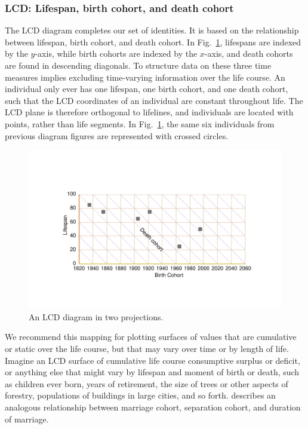 \documentclass[12pt,oneside,a4paper]{article} %
\theoremstyle{definition}
\begin{document}
\FloatBarrier
\subsubsection{LCD: Lifespan, birth cohort, and death cohort}
\label{sec:lcd}
\FloatBarrier

The LCD diagram completes our set of identities. It is based on the relationship
between lifespan, birth cohort, and death cohort. In
Fig.~\ref{fig:LCD}, lifespans are indexed by the $y$-axis, while birth cohorts are indexed by the $x$-axis, and death cohorts
are found in descending diagonals. To structure data on these three
time measures implies excluding time-varying information over the life course.
An individual
only ever has one lifespan, one birth cohort, and one death cohort, such that
the LCD coordinates of an individual are constant throughout life.
The LCD plane is therefore orthogonal to lifelines, and individuals are located
with points, rather than life segments.
In Fig.~\ref{fig:LCD}, the same six individuals from previous diagram figures are represented with crossed circles.

\begin{figure}[h!] 
\caption{An LCD diagram in two projections.}
\label{fig:LCD}
\centering
\vspace{-5em}
\includegraphics[scale=0.8]{Figures/LCDrt.pdf}
\end{figure} 

We
recommend this mapping for plotting surfaces of values that are cumulative or
static over the life course, but that may vary over time or by length of life.
Imagine an LCD surface of cumulative life course consumptive surplus or deficit,
or anything else that might vary by lifespan and moment of birth or death, such as children ever born, years of retirement, the
size of trees or other aspects of forestry, populations of buildings in large
cities, and so forth. \citet{lexis1875einleitung} describes an analogous
relationship between marriage cohort, separation cohort, and duration of
marriage.
\end{document}
